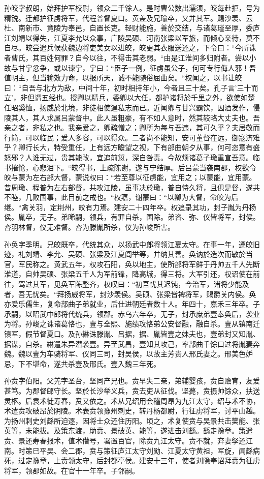 \documentclass[12pt,UTF8]{ctexbook}
\begin{document}
孙皎字叔朗，始拜护军校尉，领众二千馀人。是时曹公数出濡须，皎每赴拒，号为精锐。迁都护征虏将军，代程普督夏口。黄盖及兄瑜卒，又并其军。赐沙羡、云杜、南新市、竟陵为奉邑，自置长吏。轻财能施，善於交结，与诸葛瑾至厚，委庐江刘靖以得失，江夏李允以众事，广陵吴硕、河南张梁以军旅，而倾心亲待，莫不自尽。皎尝遣兵候获魏边将吏美女以进皎，皎更其衣服送还之，下令曰：“今所诛者曹氏，其百姓何罪？自今以往，不得击其老弱。“由是江淮间多归附者。尝以小故与甘宁忿争，或以谏宁，宁曰：“臣子一例，征虏虽公子，何可专行侮人邪！吾值明主，但当输效力命，以报所天，诚不能随俗屈曲矣。“权闻之，以书让皎曰：“自吾与北方为敌，中间十年，初时相持年小，今者且三十矣。孔子言'三十而立'，非但谓五经也。授卿以精兵，委卿以大任，都护诸将於千里之外，欲使如楚任昭奚恤，扬威於北境，非徒相使逞私志而已。近闻卿与甘兴霸饮，因酒发作，侵陵其人，其人求属吕蒙督中。此人虽粗豪，有不如人意时，然其较略大丈夫也。吾亲之者，非私之也。我亲爱之，卿疏憎之；卿所为每与吾违，其可久乎？夫居敬而行简，可以临民；爱人多容，可以得众。二者尚不能知，安可董督在远，御寇济难乎？卿行长大，特受重任，上有远方瞻望之视，下有部曲朝夕从事，何可恣意有盛怒邪？人谁无过，贵其能改，宜追前愆，深自咎责。今故烦诸葛子瑜重宣吾意。临书摧怆，心悲泪下。“皎得书，上疏陈谢，遂与宁结厚。后吕蒙当袭南郡，权欲令皎与蒙为左右部大督，蒙说权曰：“若至尊以征虏能，宜用之；以蒙能，宜用蒙。昔周瑜、程普为左右部督，共攻江陵，虽事决於瑜，普自恃久将，且俱是督，遂共不睦，几败国事，此目前之戒也。“权寤，谢蒙曰：“以卿为大督，命皎为后继。“禽关羽，定荆州，皎有力焉。建安二十四年卒。权追录其功，封子胤为丹杨侯。胤卒，无子。弟晞嗣，领兵，有罪自杀，国除。弟咨、弥、仪皆将军，封侯。咨羽林督，仪无难督。咨为滕胤所杀，仪为孙峻所害。

孙奂字季明。兄皎既卒，代统其众，以扬武中郎将领江夏太守。在事一年，遵皎旧迹，礼刘靖、李允、吴硕、张梁及江夏闾举等，并纳其善。奂讷於造次而敏於当官，军民称之。黄武五年，权攻石阳，奂以地主，使所部将军鲜于丹帅五千人先断淮道，自帅吴硕、张梁五千人为军前锋，降高城，得三将。大军引还，权诏使在前往，驾过其军，见奂军陈整齐，权叹曰：“初吾忧其迟钝，今治军，诸将少能及者，吾无忧矣。“拜扬威将军，封沙羡侯。吴硕、张梁皆裨将军，赐爵关内侯。奂亦爱乐儒生，复命部曲子弟就业，后仕进朝廷者数十人。年四十，嘉禾三年卒。子承嗣，以昭武中郎将代统兵，领郡。赤乌六年卒，无子，封承庶弟壹奉奂后，袭业为将。孙峻之诛诸葛恪也，壹与全熙、施绩攻恪弟公安督融，融自杀。壹从镇南迁镇军，假节督夏口。及孙綝诛滕胤、吕据，据、胤皆壹之妹夫也，壹弟封又知胤、据谋，自杀。綝遣朱异潜袭壹。异至武昌，壹知其攻己，率部曲千馀口过将胤妻奔魏。魏以壹为车骑将军、仪同三司，封吴侯，以故主芳贵人邢氏妻之。邢美色妒忌，下不堪命，遂共杀壹及邢氏。壹入魏三年死。

孙贲字伯阳。父羌字圣台，坚同产兄也。贲早失二亲，弟辅婴孩，贲自赡育，友爱甚笃。为郡督邮守长。坚於长沙举义兵，贲去吏从征伐。坚薨，贲摄帅馀众，扶送灵柩。后袁术徙寿春，贲又依之。术从兄绍用会稽周昂为九江太守，绍与术不协，术遣贲攻破昂於阴陵。术表贲领豫州刺史，转丹杨都尉，行征虏将军，讨平山越。为扬州刺史刘繇所迫逐，因将士众还住历阳。顷之，术复使贲与吴景共击樊能、张英等，未能拔。及策东渡，助贲、景破英、能等，遂进击刘繇。繇走豫章。策遣贲、景还寿春报术，值术僣号，署置百官，除贲九江太守。贲不就，弃妻孥还江南。时策已平吴、会二郡，贲与策征庐江太守刘勋、江夏太守黄祖，军旋，闻繇病死，过定豫章，上贲领太守，后封都亭侯。建安十三年，使者刘隐奉诏拜贲为征虏将军，领郡如故。在官十一年卒。子邻嗣。
\end{document}
